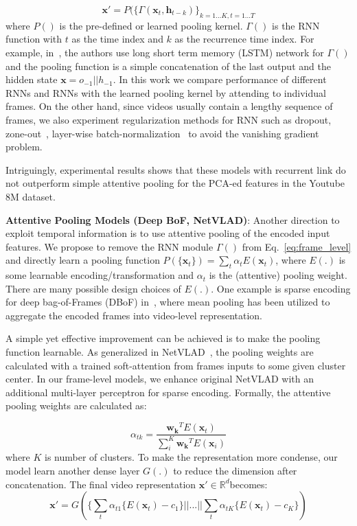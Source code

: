 \documentclass[10pt,twocolumn,letterpaper]{article}
\begin{document}
\begin{equation}
\mathbf{x}'=P(\{\Gamma(\mathbf{x}_t,\mathbf{h}_{t-k})\}_{k=1...K,t=1...T}\label{eq:frame_level}
\end{equation}
where $P()$ is the pre-defined or learned pooling kernel. $\Gamma()$ is the RNN function with $t$ as the time index and $k$ as the recurrence time index. For example, in~\cite{yt8m}, the authors use long short term memory (LSTM) network for $\Gamma()$ and the pooling function is a simple concatenation of the last output and the hidden state  $\mathbf{x}=o_{-1}||h_{-1}$. In this work we compare performance of different RNNs and RNNs with the learned pooling kernel by attending to individual frames. On the other hand, since videos usually contain a lengthy sequence of frames, we also experiment regularization methods for RNN such as dropout, zone-out~\cite{krueger2016zoneout}, layer-wise batch-normalization~\cite{cooijmans2016recurrent} to avoid the vanishing gradient problem.   

Intriguingly, experimental results shows that these models with recurrent link do not outperform simple attentive pooling for the PCA-ed features in the Youtube 8M dataset.


\textbf{Attentive Pooling Models (Deep BoF, NetVLAD)}:
Another direction to exploit temporal information is to use attentive pooling of the encoded input features. We propose to remove the RNN module $\Gamma()$ from Eq.~\ref{eq:frame_level} and directly learn a pooling function $P(\{\mathbf{x}_t\})=\sum_t{\alpha_t E(\mathbf{x}_t)}$, where $E(.)$ is some learnable encoding/transformation and $\alpha_t$ is the (attentive) pooling weight. There are many possible design choices of $E(.)$. One example is sparse encoding for deep bag-of-Frames (DBoF) in~\cite{yt8m}, where mean pooling has been utilized to aggregate the encoded frames into video-level representation.

A simple yet effective improvement can be achieved is to make the pooling function learnable. As generalized in NetVLAD~\cite{arandjelovic2016netvlad}, the pooling weights are calculated with a trained soft-attention from frames inputs to some given cluster center. In our frame-level models, we enhance original NetVLAD with an additional multi-layer perceptron for sparse encoding. Formally, the attentive pooling weights are calculated as:  

\begin{equation}
\alpha_{tk}=\frac{\mathbf{w_k}^TE(\mathbf{x}_t)}{\sum_i^K \mathbf{w_k}^TE(\mathbf{x}_i)}
\end{equation}
where $K$ is number of clusters. To make the representation more condense, our model learn another dense layer $G(.)$ to reduce the dimension after concatenation. The final video representation $\mathbf{x}' \in \mathbb{R}^d$becomes:
\begin{equation}
\mathbf{x}'= G(\{\sum_t \alpha_{t1} \{ E(\mathbf{x}_t)- c_1 \} || ... || \sum_t \alpha_{tK} \{ E(\mathbf{x}_t)- c_K \}) 
\end{equation}
\end{document}
